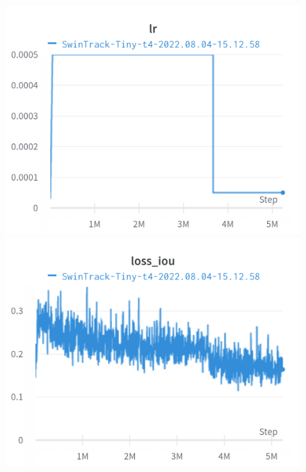 \documentclass{article}
\begin{document}
\begin{figure}[h]
\includegraphics[width=\linewidth]{charts/Section-2-Panel-12-bzoemlec5}
\caption{}
\endminipage\hfill
{}
\includegraphics[width=\linewidth]{charts/Section-2-Panel-13-ffs6mrffa}
\caption{}
\endminipage
\end{figure}
\end{document}
